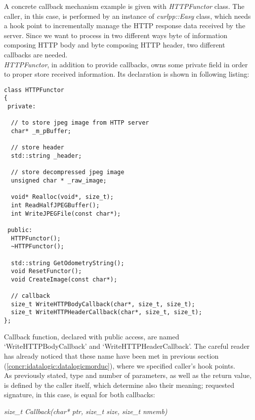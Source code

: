 A concrete callback mechanism example is given with \textit{HTTPFunctor}
class. The caller, in this case, is performed by an instance of
\textit{curlpp::Easy} class, which needs a hook point to incrementally
manage the HTTP response data received by the server. Since we want to
process in two different ways byte of information composing HTTP body
and byte composing HTTP header, two different callbacks are needed.
\\
\textit{HTTPFunctor}, in addition to provide callbacks, owns some
private field in order to proper store received information. Its
declaration is shown in following listing:
\\
\begin{lstlisting}[caption={\texttt{HTTPFunctor} declaration},
    label={code:datalogiclogsimulator:httpfunctor:declaration}]
class HTTPFunctor
{
 private:

  // to store jpeg image from HTTP server
  char* _m_pBuffer;

  // store header
  std::string _header;

  // store decompressed jpeg image
  unsigned char * _raw_image;

  void* Realloc(void*, size_t);
  int ReadHalfJPEGBuffer();
  int WriteJPEGFile(const char*);

 public:
  HTTPFunctor();
  ~HTTPFunctor();

  std::string GetOdometryString();
  void ResetFunctor();
  void CreateImage(const char*);

  // callback
  size_t WriteHTTPBodyCallback(char*, size_t, size_t);
  size_t WriteHTTPHeaderCallback(char*, size_t, size_t);
};
\end{lstlisting}

Callback function, declared with public access, are named
`WriteHTTPBodyCallback' and `WriteHTTPHeaderCallback'. The
careful reader has already noticed that these name have been
 met in previous section
(\ref{concr:idatalogic:datalogicmorduc}), where we specified
caller's hook points.
\\
As previously stated, type and number of parameters, as well
as the return value, is defined by the caller itself, which
determine also their meaning; requested signature, in this
case, is equal for both callbacks:

\begin{center}

\textit{size\_t Callback(char* ptr, size\_t size, size\_t nmemb)}

\end{center}

